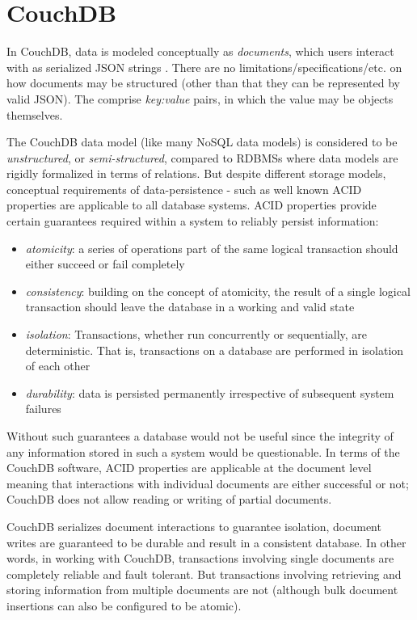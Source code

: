 \section{CouchDB}
In CouchDB, data is modeled conceptually as \textit{documents}, which users interact with as serialized JSON strings \cite{rfc7159}. There are no limitations/specifications/etc. on how documents may be structured (other than that they can be represented by valid JSON). The comprise \textit{key:value} pairs, in which the value may be objects themselves.

The CouchDB data model (like many NoSQL data models) is considered to be \textit{unstructured}, or \textit{semi-structured}, compared to RDBMSs where data models are rigidly formalized in terms of relations. But despite different storage models, conceptual requirements of data-persistence - such as well known ACID properties are applicable to all database systems. ACID properties provide certain guarantees required within a system to reliably persist information:

\begin{itemize}
    \item \textit{atomicity}: a series of operations part of the same logical transaction should either succeed or fail completely
    \item \textit{consistency}: building on the concept of atomicity, the result of a single logical transaction should leave the database in a working and valid state
    \item \textit{isolation}: Transactions, whether run concurrently or sequentially, are deterministic. That is, transactions on a database are performed in isolation of each other
    \item \textit{durability}: data is persisted permanently irrespective of subsequent system failures
\end{itemize}

Without such guarantees a database would not be useful since the integrity of any information stored in such a system would be questionable. In terms of the CouchDB software, ACID properties are applicable at the document level meaning that interactions with individual documents are either successful or not; CouchDB does not allow reading or writing of partial documents.

CouchDB serializes document interactions to guarantee isolation, document writes are guaranteed to be durable and result in a consistent database. In other words, in working with CouchDB, transactions involving single documents are completely reliable and fault tolerant. But transactions involving retrieving and storing information from multiple documents are not (although bulk document insertions can also be configured to be atomic).

